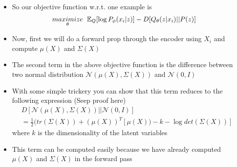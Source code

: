 \begin{frame}
	\begin{columns}
		\begin{overlayarea}{\textwidth}{\textheight}
		\vspace{1cm}
		
		\end{overlayarea}
		\begin{overlayarea}{\textwidth}{\textheight}
			\footnotesize{\begin{itemize}[<+->]\justifying
				\item So our objective function w.r.t. one example is 
				\vspace{-0.1cm}
				\begin{align*}
				\underset{\theta}{maximize}  \hspace{0.2cm}\mathbb{E}_Q[\log P_\phi(x_i|z)] - D [Q_\theta(z|x_i) || P(z)]
				\end{align*}
				\vspace{-0.3cm}
				\item Now, first we will do a forward prop through the encoder using $X_i$ 
				and compute $\mu(X)$ and $\Sigma (X)$
				\item<5-> The second term in the above objective function is the difference between two normal distribution $\mathcal{N}(\mu(X), \Sigma(X))$ and $\mathcal{N}(0, I)$
				\item<6-> With some simple trickery you can show that this term reduces to the following expression (Seep proof here)
				\begin{align*}
				&D[\mathcal{N}(\mu(X),\Sigma(X))||\mathcal{N}(0,I)] \\
				&=\frac{1}{2}(tr(\Sigma(X))+(\mu(X))^T[\mu(X))-k-\log det(\Sigma(X))]
				\end{align*}
				where $k$ is the dimensionality of the latent variables 
				\item<7-> This term can be computed easily because we have already computed $\mu(X)$ and $\Sigma(X)$ in the forward pass 
			\end{itemize}}
		\end{overlayarea}
	\end{columns}
\end{frame}

